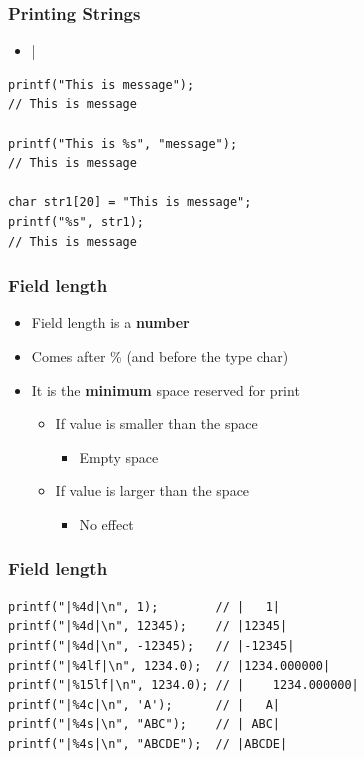 \documentclass{../c-lecture}
\begin{document}
\begin{frame}[fragile]
  \frametitle{Printing Strings}
  \begin{itemize}
    \item {}|%
  \end{itemize}
  \begin{verbatim}
printf("This is message");
// This is message

printf("This is %s", "message");
// This is message

char str1[20] = "This is message";
printf("%s", str1);
// This is message
  \end{verbatim}
\end{frame}

\begin{frame}
  \frametitle{Field length}
  \begin{itemize}
    \item Field length is a \textbf{\color{Orange} number}
    \item Comes after \% (and before the type char)
    \item
      It is the \textbf{\color{Green} minimum} space reserved for print

    \begin{itemize}
      \item If value is smaller than the space
      \begin{itemize}
        \item Empty space
      \end{itemize}
      \item If value is larger than the space
      \begin{itemize}
        \item No effect
      \end{itemize}
    \end{itemize}
  \end{itemize}
\end{frame}

\begin{frame}[fragile]
  \frametitle{Field length}
  \begin{verbatim}
printf("|%4d|\n", 1);        // |   1|
printf("|%4d|\n", 12345);    // |12345|
printf("|%4d|\n", -12345);   // |-12345|
printf("|%4lf|\n", 1234.0);  // |1234.000000|
printf("|%15lf|\n", 1234.0); // |    1234.000000|
printf("|%4c|\n", 'A');      // |   A|
printf("|%4s|\n", "ABC");    // | ABC|
printf("|%4s|\n", "ABCDE");  // |ABCDE|
  \end{verbatim}
\end{frame}
\end{document}
